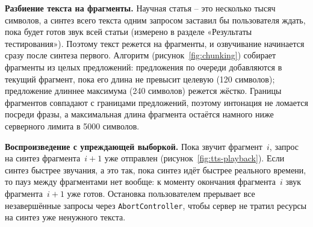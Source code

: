 
\textbf{Разбиение текста на фрагменты.} Научная статья -- это
несколько тысяч символов, а синтез всего текста одним запросом
заставил бы пользователя ждать, пока будет готов звук всей статьи
(измерено в разделе «Результаты тестирования»). Поэтому текст режется на
фрагменты, и озвучивание начинается сразу после синтеза
первого. Алгоритм (рисунок~\ref{fig:chunking}) собирает
фрагменты из целых предложений: предложения по очереди добавляются в
текущий фрагмент, пока его длина не превысит целевую (120 символов);
предложение длиннее максимума (240 символов) режется жёстко.
Границы фрагментов совпадают с границами предложений, поэтому
интонация не ломается посреди фразы, а максимальная длина фрагмента
остаётся намного ниже серверного лимита в 5000 символов.


\textbf{Воспроизведение с упреждающей выборкой.} Пока звучит
фрагмент~$i$, запрос на синтез фрагмента~$i+1$ уже отправлен
(рисунок~\ref{fig:tts-playback}). Если синтез быстрее звучания, а это
так, пока синтез идёт быстрее реального времени, то пауз между
фрагментами нет вообще: к моменту окончания фрагмента~$i$ звук
фрагмента~$i+1$ уже готов. Остановка пользователем прерывает все
незавершённые запросы через \texttt{AbortController}, чтобы сервер не
тратил ресурсы на синтез уже ненужного текста.



